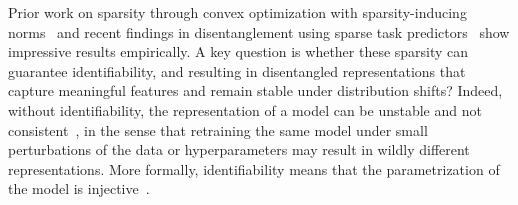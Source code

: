 \documentclass{article} %
\theoremstyle{plain}
\theoremstyle{definition}
\theoremstyle{remark}
\numberwithin{equation}{section}
\begin{document}
Prior work on sparsity through convex optimization with sparsity-inducing norms~\citep{bach2011convex} and recent findings in disentanglement using sparse task predictors~\citep{lachapelle2023synergies, lachapelle2022disentanglement} show impressive results empirically. A key question is whether these sparsity can guarantee identifiability, and resulting in disentangled representations that capture meaningful features and remain stable under distribution shifts?  Indeed, without identifiability, the representation of a model can be unstable and not consistent~\citep{locatello2019challenging,lenc2015understanding}, in the sense that retraining the same model under small perturbations of the data or hyperparameters may result in wildly different representations.
More formally, identifiability means that the parametrization of the model is injective~\citep{roeder2020linear, khemakhem2020variational}. %
\end{document}
